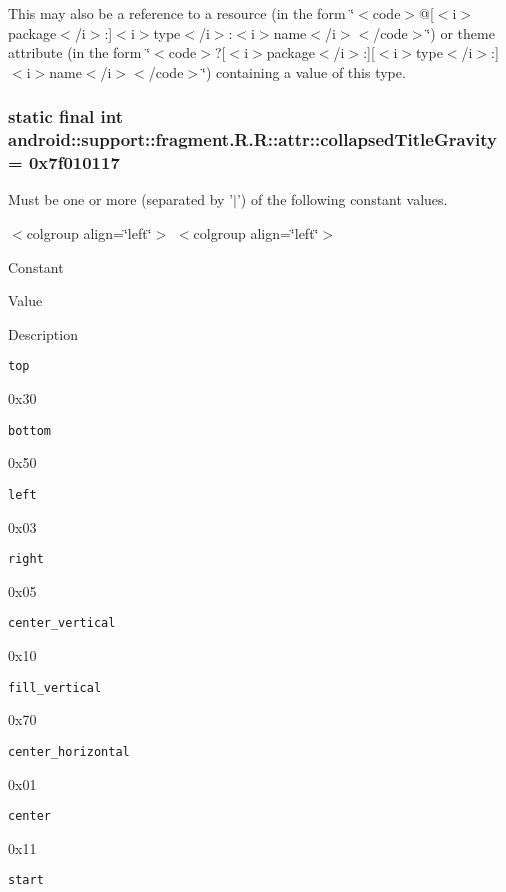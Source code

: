 This may also be a reference to a resource (in the form \char`\"{}$<$code$>$@\mbox{[}$<$i$>$package$<$/i$>$:\mbox{]}$<$i$>$type$<$/i$>$:$<$i$>$name$<$/i$>$$<$/code$>$\char`\"{}) or theme attribute (in the form \char`\"{}$<$code$>$?\mbox{[}$<$i$>$package$<$/i$>$:\mbox{]}\mbox{[}$<$i$>$type$<$/i$>$:\mbox{]}$<$i$>$name$<$/i$>$$<$/code$>$\char`\"{}) containing a value of this type. \hypertarget{classandroid_1_1support_1_1fragment_1_1_r_1_1attr_3e51623ebbb22435a0bae97748ac73b3}{
\subsubsection[{collapsedTitleGravity}]{\setlength{\rightskip}{0pt plus 5cm}static final int android::support::fragment.R.R::attr::collapsedTitleGravity = 0x7f010117}}
\label{classandroid_1_1support_1_1fragment_1_1_r_1_1attr_3e51623ebbb22435a0bae97748ac73b3}


Must be one or more (separated by '$|$') of the following constant values. \begin{TabularC}{0}
\hline
\end{TabularC}
$<$colgroup align=\char`\"{}left\char`\"{}$>$ $<$colgroup align=\char`\"{}left\char`\"{}$>$ 

Constant

Value

Description 

{\tt top}

0x30

{\tt bottom}

0x50

{\tt left}

0x03

{\tt right}

0x05

{\tt center\_\-vertical}

0x10

{\tt fill\_\-vertical}

0x70

{\tt center\_\-horizontal}

0x01

{\tt center}

0x11

{\tt start}


